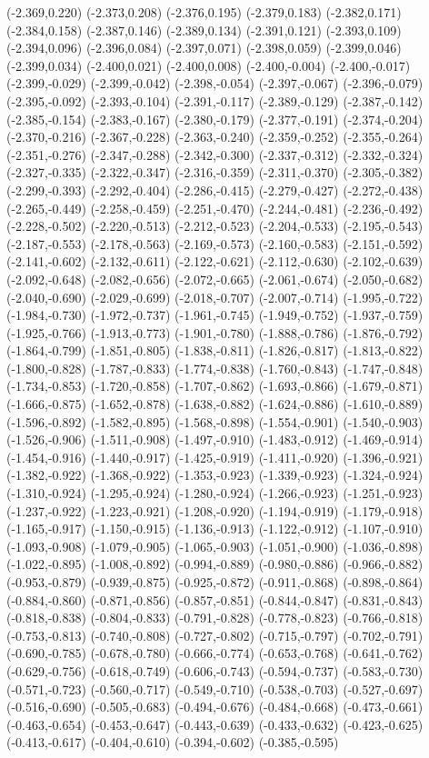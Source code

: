 (-2.369,0.220) (-2.373,0.208) (-2.376,0.195) (-2.379,0.183) (-2.382,0.171) (-2.384,0.158) (-2.387,0.146) (-2.389,0.134) (-2.391,0.121) (-2.393,0.109) (-2.394,0.096) (-2.396,0.084) (-2.397,0.071) (-2.398,0.059) (-2.399,0.046) (-2.399,0.034) (-2.400,0.021) (-2.400,0.008) (-2.400,-0.004) (-2.400,-0.017) (-2.399,-0.029) (-2.399,-0.042) (-2.398,-0.054) (-2.397,-0.067) (-2.396,-0.079) (-2.395,-0.092) (-2.393,-0.104) (-2.391,-0.117) (-2.389,-0.129) (-2.387,-0.142) (-2.385,-0.154) (-2.383,-0.167) (-2.380,-0.179) (-2.377,-0.191) (-2.374,-0.204) (-2.370,-0.216) (-2.367,-0.228) (-2.363,-0.240) (-2.359,-0.252) (-2.355,-0.264) (-2.351,-0.276) (-2.347,-0.288) (-2.342,-0.300) (-2.337,-0.312) (-2.332,-0.324) (-2.327,-0.335) (-2.322,-0.347) (-2.316,-0.359) (-2.311,-0.370) (-2.305,-0.382) (-2.299,-0.393) (-2.292,-0.404) (-2.286,-0.415) (-2.279,-0.427) (-2.272,-0.438) (-2.265,-0.449) (-2.258,-0.459) (-2.251,-0.470) (-2.244,-0.481) (-2.236,-0.492) (-2.228,-0.502) (-2.220,-0.513) (-2.212,-0.523) (-2.204,-0.533) (-2.195,-0.543) (-2.187,-0.553) (-2.178,-0.563) (-2.169,-0.573) (-2.160,-0.583) (-2.151,-0.592) (-2.141,-0.602) (-2.132,-0.611) (-2.122,-0.621) (-2.112,-0.630) (-2.102,-0.639) (-2.092,-0.648) (-2.082,-0.656) (-2.072,-0.665) (-2.061,-0.674) (-2.050,-0.682) (-2.040,-0.690) (-2.029,-0.699) (-2.018,-0.707) (-2.007,-0.714) (-1.995,-0.722) (-1.984,-0.730) (-1.972,-0.737) (-1.961,-0.745) (-1.949,-0.752) (-1.937,-0.759) (-1.925,-0.766) (-1.913,-0.773) (-1.901,-0.780) (-1.888,-0.786) (-1.876,-0.792) (-1.864,-0.799) (-1.851,-0.805) (-1.838,-0.811) (-1.826,-0.817) (-1.813,-0.822) (-1.800,-0.828) (-1.787,-0.833) (-1.774,-0.838) (-1.760,-0.843) (-1.747,-0.848) (-1.734,-0.853) (-1.720,-0.858) (-1.707,-0.862) (-1.693,-0.866) (-1.679,-0.871) (-1.666,-0.875) (-1.652,-0.878) (-1.638,-0.882) (-1.624,-0.886) (-1.610,-0.889) (-1.596,-0.892) (-1.582,-0.895) (-1.568,-0.898) (-1.554,-0.901) (-1.540,-0.903) (-1.526,-0.906) (-1.511,-0.908) (-1.497,-0.910) (-1.483,-0.912) (-1.469,-0.914) (-1.454,-0.916) (-1.440,-0.917) (-1.425,-0.919) (-1.411,-0.920) (-1.396,-0.921) (-1.382,-0.922) (-1.368,-0.922) (-1.353,-0.923) (-1.339,-0.923) (-1.324,-0.924) (-1.310,-0.924) (-1.295,-0.924) (-1.280,-0.924) (-1.266,-0.923) (-1.251,-0.923) (-1.237,-0.922) (-1.223,-0.921) (-1.208,-0.920) (-1.194,-0.919) (-1.179,-0.918) (-1.165,-0.917) (-1.150,-0.915) (-1.136,-0.913) (-1.122,-0.912) (-1.107,-0.910) (-1.093,-0.908) (-1.079,-0.905) (-1.065,-0.903) (-1.051,-0.900) (-1.036,-0.898) (-1.022,-0.895) (-1.008,-0.892) (-0.994,-0.889) (-0.980,-0.886) (-0.966,-0.882) (-0.953,-0.879) (-0.939,-0.875) (-0.925,-0.872) (-0.911,-0.868) (-0.898,-0.864) (-0.884,-0.860) (-0.871,-0.856) (-0.857,-0.851) (-0.844,-0.847) (-0.831,-0.843) (-0.818,-0.838) (-0.804,-0.833) (-0.791,-0.828) (-0.778,-0.823) (-0.766,-0.818) (-0.753,-0.813) (-0.740,-0.808) (-0.727,-0.802) (-0.715,-0.797) (-0.702,-0.791) (-0.690,-0.785) (-0.678,-0.780) (-0.666,-0.774) (-0.653,-0.768) (-0.641,-0.762) (-0.629,-0.756) (-0.618,-0.749) (-0.606,-0.743) (-0.594,-0.737) (-0.583,-0.730) (-0.571,-0.723) (-0.560,-0.717) (-0.549,-0.710) (-0.538,-0.703) (-0.527,-0.697) (-0.516,-0.690) (-0.505,-0.683) (-0.494,-0.676) (-0.484,-0.668) (-0.473,-0.661) (-0.463,-0.654) (-0.453,-0.647) (-0.443,-0.639) (-0.433,-0.632) (-0.423,-0.625) (-0.413,-0.617) (-0.404,-0.610) (-0.394,-0.602) (-0.385,-0.595) 